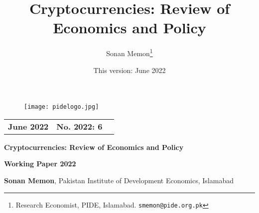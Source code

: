 \documentclass[12pt]{article}
\newcommand{\1}{\mathbbm 1}
\begin{document}
	
	
	
	
	\begin{figure}[H]
		\begin{center}
			\texttt{[image: pidelogo.jpg]}		
			\caption*{}
		\end{center}
	\end{figure}

\vspace{-0.5ex}

\begin{tabular}{l@{\hskip 4in}c@{\hskip 1in}c}
	\textbf{June 2022} & \textbf{No. 2022: 6}
	\vspace{0.15cm} \\
\end{tabular}

\begin{center}
\textbf{Cryptocurrencies: Review of Economics and Policy}
\end{center}

\begin{center}
	\textbf{Working Paper 2022}
\end{center}

\begin{center}
	\textbf{Sonan Memon}, Pakistan Institute of Development Economics, Islamabad
\end{center}



\newpage{}



	
	\title{{Cryptocurrencies: Review of Economics and Policy  %
			}}
		
	
			
			\date{This version: June 2022}%
		
		
		\author{Sonan Memon\footnote{Research Economist, PIDE, Islamabad. \texttt{smemon@pide.org.pk}}}
		
		
		
		\newpage{}
		
		\maketitle
		\vspace{-2ex}
		
\end{document}
